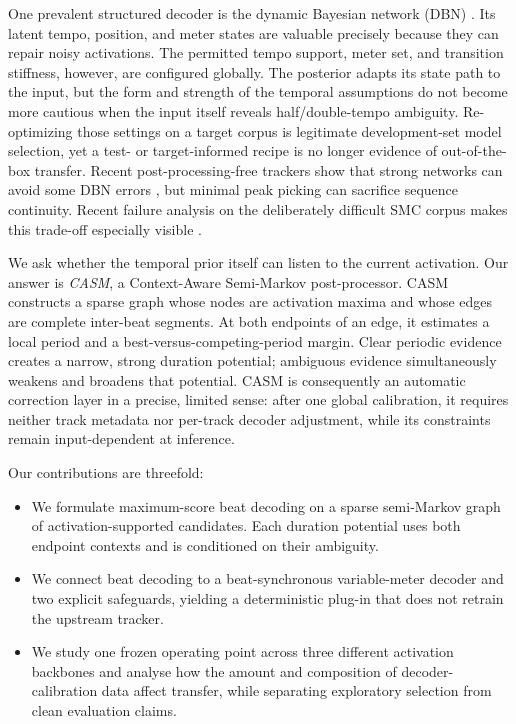 \documentclass{article}
\begin{document}
One prevalent structured decoder is the dynamic Bayesian network (DBN) \cite{krebs2015dbn}. Its latent tempo, position, and meter states are valuable precisely because they can repair noisy activations. The permitted tempo support, meter set, and transition stiffness, however, are configured globally. The posterior adapts its state path to the input, but the form and strength of the temporal assumptions do not become more cautious when the input itself reveals half/double-tempo ambiguity. Re-optimizing those settings on a target corpus is legitimate development-set model selection, yet a test- or target-informed recipe is no longer evidence of out-of-the-box transfer. Recent post-processing-free trackers show that strong networks can avoid some DBN errors \cite{chen2022postprocessingfree,foscarin2024beat}, but minimal peak picking can sacrifice sequence continuity. Recent failure analysis on the deliberately difficult SMC corpus makes this trade-off especially visible \cite{ahn2026smcblindspot}.

We ask whether the temporal prior itself can listen to the current activation. Our answer is \emph{CASM}, a Context-Aware Semi-Markov post-processor. CASM constructs a sparse graph whose nodes are activation maxima and whose edges are complete inter-beat segments. At both endpoints of an edge, it estimates a local period and a best-versus-competing-period margin. Clear periodic evidence creates a narrow, strong duration potential; ambiguous evidence simultaneously weakens and broadens that potential. CASM is consequently an automatic correction layer in a precise, limited sense: after one global calibration, it requires neither track metadata nor per-track decoder adjustment, while its constraints remain input-dependent at inference.

Our contributions are threefold:
\begin{itemize}
\item We formulate maximum-score beat decoding on a sparse semi-Markov graph of activation-supported candidates. Each duration potential uses both endpoint contexts and is conditioned on their ambiguity.
\item We connect beat decoding to a beat-synchronous variable-meter decoder and two explicit safeguards, yielding a deterministic plug-in that does not retrain the upstream tracker.
\item We study one frozen operating point across three different activation backbones and analyse how the amount and composition of decoder-calibration data affect transfer, while separating exploratory selection from clean evaluation claims.
\end{itemize}
\end{document}
